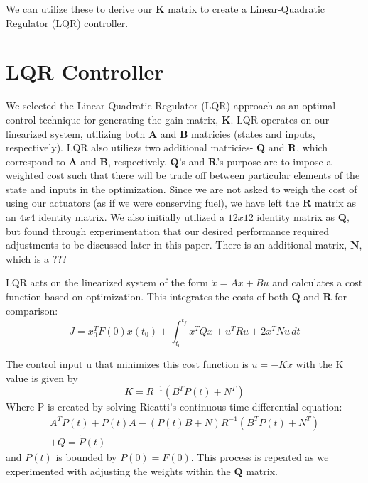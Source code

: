 \documentclass{article}
\begin{document}
\begin{multicols}{2}
We can utilize these to derive our $\boldsymbol{K}$ matrix to create a Linear-Quadratic Regulator (LQR) controller.

\section*{LQR Controller}
We selected the Linear-Quadratic Regulator (LQR) approach as an optimal control technique for generating the gain matrix, $\boldsymbol{K}$.  LQR operates on our linearized system, utilizing both $\boldsymbol{A}$ and $\boldsymbol{B}$ matricies (states and inputs, respectively). LQR also utiliezs two additional matricies- $\boldsymbol{Q}$ and $\boldsymbol{R}$, which correspond to $\boldsymbol{A}$ and $\boldsymbol{B}$, respectively. $\boldsymbol{Q}$'s and $\boldsymbol{R}$'s purpose are to impose a weighted cost such that there will be trade off between particular elements of the state and inputs in the optimization. Since we are not asked to weigh the cost of using our actuators (as if we were conserving fuel), we have left the $\boldsymbol{R}$ matrix as an $4x4$ identity matrix. We also initially utilized a $12x12$ identity matrix as $\boldsymbol{Q}$, but found through experimentation that our desired performance required adjustments to be discussed later in this paper. There is an additional matrix, $\boldsymbol{N}$, which is a ???

LQR acts on the linearized system of the form $\dot{x} = Ax + Bu$ and calculates a cost function based on optimization.  This integrates the costs of both $\boldsymbol{Q}$ and $\boldsymbol{R}$ for comparison:
\begin{equation}
J =x_0^TF(0)x(t_0) +  \int_{t_0}^{t_f} x^TQx+u^TRu +2x^TNu\,dt 
\end{equation}

The control input u that minimizes this cost function is $u= -Kx$ with the K value is given by
\begin{equation}
K = R^{-1}(B^TP(t) + N^T)
\end{equation}
\noindent
Where P is created by solving Ricatti's continuous time differential equation:
\begin{align}
A^TP(t) + P(t)A - (P(t)B + N)R^{-1}(B^TP(t) + N^T) \nonumber\\+ Q = \dot{P}(t)
\end{align}
\noindent
and $P(t)$ is bounded by $P(0) = F(0)$. This process is repeated as we experimented with adjusting the weights within the $\boldsymbol{Q}$ matrix.


\end{multicols}
\end{document}

